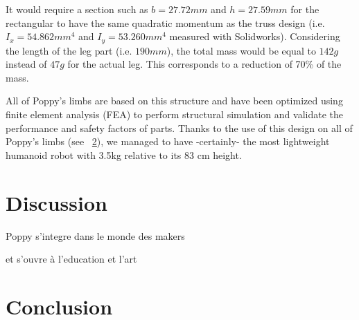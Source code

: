\begin{figure}[!h]
\centering
    \hfil
    \caption{}
    \label{fig:leg_section}
\end{figure}

It would require a section such as $b=27.72 mm$ and $h=27.59 mm$ for the rectangular to have the same quadratic momentum as the truss design (i.e. $I_x = 54.862 mm^4$ and $I_y = 53.260 mm^4$ measured with Solidworks).
Considering the length of the leg part (i.e. $190 mm$), the total mass would be equal to $142 g$ instead of $47 g$ for the actual leg. This corresponds to a reduction of 70\% of the mass.

\begin{figure}[!h]
\centering


    \caption{}
    \label{fig:poppy_truss_structure}
\end{figure}

All of Poppy’s limbs are based on this structure and have been optimized using finite element analysis (FEA) to perform structural simulation and validate the performance and safety factors of parts.
Thanks to the use of this design on all of Poppy's limbs (see \figurename~\ref{fig:poppy_truss_structure}), we managed to have -certainly- the most lightweight humanoid robot with 3.5kg relative to its 83 cm height.








\clearpage
\section{Discussion} %

Poppy s'integre dans le monde des makers

et s'ouvre à l'education et l'art





\section{Conclusion} %


